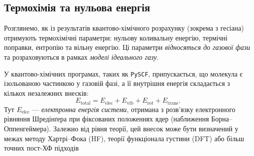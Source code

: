 {%

\subsection{Термохімія та нульова енергія}


Розглянемо, як із результатів квантово-хімічного
розрахунку (зокрема з гесіана) отримують термохімічні параметри:
нульову коливальну енергію, термічні поправки, ентропію та вільну енергію.
Ці параметри \emph{відносяться до газової фази} та
розраховуються в рамках \emph{моделі ідеального газу}.

У квантово-хімічних програмах, таких як \texttt{PySCF},
припускається, що молекула є ізольованою частинкою у газовій фазі,
а її внутрішня енергія складається з кількох незалежних внесків:
\[
E_{\text{total}} = E_{\text{elec}} + E_{\text{vib}} + E_{\text{rot}} + E_{\text{trans}}.
\]
Тут $E_{\text{elec}}$ --- \emph{електронна енергія системи},
отримана з розв’язку електронного рівняння Шредінґера
при фіксованих положеннях ядер (наближення Борна–Оппенгеймера).
Залежно від рівня теорії, цей внесок може бути визначений
у межах методу Хартрі–Фока (HF), теорії функціонала густини (DFT)
або більш точних пост-ХФ підходів

}
